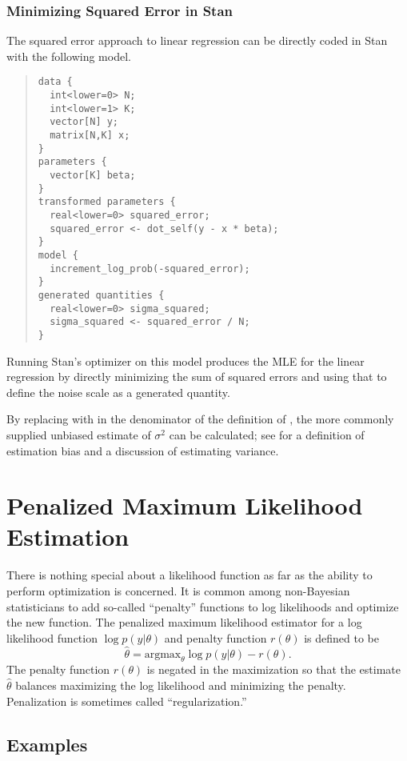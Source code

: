 \subsubsection{Minimizing Squared Error in Stan}

The squared error approach to linear regression can be directly coded
in Stan with the following model.
%
\begin{quote}
\begin{Verbatim}
data {
  int<lower=0> N;
  int<lower=1> K;
  vector[N] y;
  matrix[N,K] x;
}
parameters {
  vector[K] beta;
}
transformed parameters {
  real<lower=0> squared_error;
  squared_error <- dot_self(y - x * beta);
}
model {
  increment_log_prob(-squared_error);
}  
generated quantities {
  real<lower=0> sigma_squared;
  sigma_squared <- squared_error / N;
}
\end{Verbatim}
\end{quote}
%
Running Stan's optimizer on this model produces the MLE for the linear
regression by directly minimizing the sum of squared errors and using
that to define the noise scale as a generated quantity.

By replacing  with  in the denominator of the
definition of , the more commonly supplied
unbiased estimate of $\sigma^2$ can be calculated; see
 for a definition of estimation bias and a
discussion of estimating variance.



\section{Penalized Maximum Likelihood Estimation}

There is nothing special about a likelihood function as far as the
ability to perform optimization is concerned.  It is common among
non-Bayesian statisticians to add so-called ``penalty'' functions
to log likelihoods and optimize the new function.  The penalized
maximum likelihood estimator for a log likelihood function 
$\log p(y|\theta)$ and penalty function $r(\theta)$ is defined to be
\[
\hat{\theta} = \mbox{argmax}_{\theta} \log p(y|\theta) - r(\theta).
\]
The penalty function $r(\theta)$ is negated in the maximization so
that the estimate $\hat{\theta}$ balances maximizing the log
likelihood and minimizing the penalty.  Penalization is sometimes
called ``regularization.''


\subsection{Examples}\label{penalized-mle-examples}

